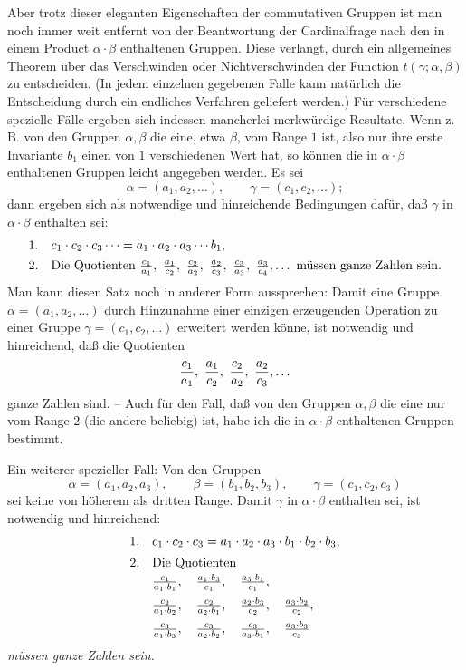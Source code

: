 \documentclass[11pt,a4paper]{article}
\begin{document}
Aber trotz dieser eleganten Eigenschaften der commutativen Gruppen ist man noch immer weit entfernt von der Beantwortung der Cardinalfrage nach den in einem Product $\alpha\cdot\beta$ enthaltenen Gruppen. Diese verlangt, durch ein allgemeines Theorem über das Verschwinden oder Nichtverschwinden der Function $t(\gamma;\alpha,\beta)$ zu entscheiden. (In jedem einzelnen gegebenen Falle kann natürlich die Entscheidung durch ein endliches Verfahren geliefert werden.) Für verschiedene spezielle Fälle ergeben sich indessen mancherlei merkwürdige Resultate. Wenn z. B. von den Gruppen $\alpha,\beta$ die eine, etwa $\beta$, vom Range $1$ ist, also nur ihre erste Invariante $b_1$ einen von $1$ verschiedenen Wert hat, so können die in $\alpha\cdot\beta$ enthaltenen Gruppen leicht angegeben werden. Es sei
\[
 \alpha=(a_1,a_2,\ldots),\qquad \gamma=(c_1,c_2,\ldots);
\]
dann ergeben sich als notwendige und hinreichende Bedingungen dafür, daß $\gamma$ in $\alpha\cdot\beta$ enthalten sei:
\[
\begin{array}{ll}
1. & c_1\cdot c_2\cdot c_3\cdots=a_1\cdot a_2\cdot a_3\cdots b_1,\\[0.4em]
2. & \text{Die Quotienten } {c_1\over a_1},\ {a_1\over c_2},\ {c_2\over a_2},\ {a_2\over c_3},\ {c_3\over a_3},\ {a_3\over c_4},\ldots\text{ müssen ganze Zahlen sein.}
\end{array}
\]
Man kann diesen Satz noch in anderer Form aussprechen: Damit eine Gruppe $\alpha=(a_1,a_2,\ldots)$ durch Hinzunahme einer einzigen erzeugenden Operation zu einer Gruppe $\gamma=(c_1,c_2,\ldots)$ erweitert werden könne, ist notwendig und hinreichend, daß die Quotienten
\[
 {c_1\over a_1},\ {a_1\over c_2},\ {c_2\over a_2},\ {a_2\over c_3},\ldots
\]
ganze Zahlen sind. -- Auch für den Fall, daß von den Gruppen $\alpha,\beta$ die eine nur vom Range $2$ (die andere beliebig) ist, habe ich die in $\alpha\cdot\beta$ enthaltenen Gruppen bestimmt.

Ein weiterer spezieller Fall: Von den Gruppen
\[
 \alpha=(a_1,a_2,a_3),\qquad
 \beta=(b_1,b_2,b_3),\qquad
 \gamma=(c_1,c_2,c_3)
\]
sei keine von höherem als dritten Range. Damit $\gamma$ in $\alpha\cdot\beta$ enthalten sei, ist notwendig und hinreichend:
\[
\begin{array}{ll}
1. & c_1\cdot c_2\cdot c_3=a_1\cdot a_2\cdot a_3\cdot b_1\cdot b_2\cdot b_3,\\[0.5em]
2. & \text{Die Quotienten}\\[0.2em]
& {c_1\over a_1\cdot b_1},\quad {a_1\cdot b_3\over c_1},\quad {a_3\cdot b_1\over c_1},\\[0.6em]
& {c_2\over a_1\cdot b_2},\quad {c_2\over a_2\cdot b_1},\quad {a_2\cdot b_3\over c_2},\quad {a_3\cdot b_2\over c_2},\\[0.6em]
& {c_3\over a_1\cdot b_3},\quad {c_3\over a_2\cdot b_2},\quad {c_3\over a_3\cdot b_1},\quad {a_3\cdot b_3\over c_3}
\end{array}
\]
\emph{müssen ganze Zahlen sein.}
\end{document}
